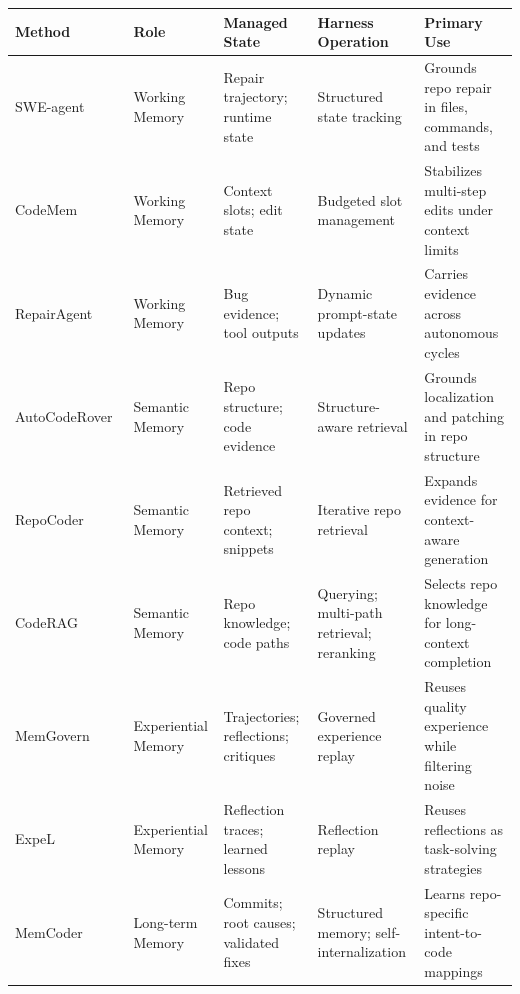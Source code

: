 \documentclass{llmxive}
\providecommand{\arraystretch}{1.15}
\begin{document}
\begin{table}[t!]
\centering
\renewcommand{\arraystretch}{1.00}
\setlength{\tabcolsep}{3.5pt}
\scriptsize
\begin{tabularx}{\textwidth}{p{2.35cm}p{2.5cm}p{3.2cm}p{2.8cm}X}
\toprule
\textbf{Method} & \textbf{Role} & \textbf{Managed State} & \textbf{Harness Operation} & \textbf{Primary Use} \\
\midrule
SWE-agent~\cite{yang2024swe} 
& Working Memory 
& Repair trajectory; runtime state
& Structured state tracking 
& Grounds repo repair in files, commands, and tests \\

CodeMem~\cite{gaurav2025codemem} 
& Working Memory 
& Context slots; edit state
& Budgeted slot management
& Stabilizes multi-step edits under context limits \\

RepairAgent~\cite{bouzenia2025repairagent}
& Working Memory 
& Bug evidence; tool outputs
& Dynamic prompt-state updates
& Carries evidence across autonomous cycles \\
\midrule

AutoCodeRover~\cite{zhang2024autocoderover} 
& Semantic Memory 
& Repo structure; code evidence
& Structure-aware retrieval 
& Grounds localization and patching in repo structure \\

RepoCoder~\cite{zhang2023repocoder} 
& Semantic Memory 
& Retrieved repo context; snippets
& Iterative repo retrieval 
& Expands evidence for context-aware generation \\

CodeRAG~\cite{zhang2025coderag} 
& Semantic Memory 
& Repo knowledge; code paths
& Querying; multi-path retrieval; reranking
& Selects repo knowledge for long-context completion \\
\midrule

MemGovern~\cite{wang2026memgovern} 
& Experiential Memory 
& Trajectories; reflections; critiques
& Governed experience replay
& Reuses quality experience while filtering noise \\

ExpeL~\cite{zhao2024expel} 
& Experiential Memory 
& Reflection traces; learned lessons
& Reflection replay
& Reuses reflections as task-solving strategies \\
\midrule

MemCoder~\cite{deng2026your}
& Long-term Memory 
& Commits; root causes; validated fixes
& Structured memory; self-internalization
& Learns repo-specific intent-to-code mappings \\


\end{tabularx}
\end{table}
\end{document}
